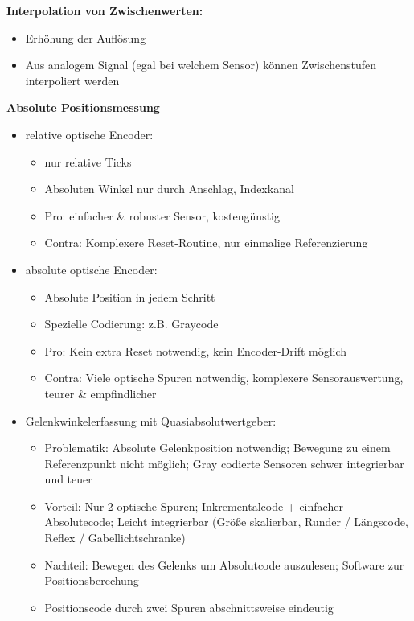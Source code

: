 \textbf{Interpolation von Zwischenwerten:}
\begin{itemize}
\setlength\itemsep{0em}
\item Erhöhung der Auflösung
\item Aus analogem Signal (egal bei welchem Sensor) können Zwischenstufen interpoliert werden
\end{itemize}

\textbf{Absolute Positionsmessung}
\begin{itemize}
\setlength\itemsep{0em}
\item relative optische Encoder:
\begin{itemize}
\setlength\itemsep{0em}
\item nur relative Ticks
\item Absoluten Winkel nur durch Anschlag, Indexkanal
\item Pro: einfacher \& robuster Sensor, kostengünstig
\item Contra: Komplexere Reset-Routine, nur einmalige Referenzierung
\end{itemize}
\item absolute optische Encoder: 
\begin{itemize}
\setlength\itemsep{0em}
\item Absolute Position in jedem Schritt
\item Spezielle Codierung: z.B. Graycode
\item Pro: Kein extra Reset notwendig, kein Encoder-Drift möglich
\item Contra: Viele optische Spuren notwendig, komplexere Sensorauswertung, teurer \& empfindlicher
\end{itemize}
\item Gelenkwinkelerfassung mit Quasiabsolutwertgeber:
\begin{itemize}
\setlength\itemsep{0em}
\item Problematik: Absolute Gelenkposition notwendig; Bewegung zu einem Referenzpunkt nicht möglich; Gray codierte Sensoren schwer integrierbar und teuer
\item Vorteil: Nur 2 optische Spuren; Inkrementalcode + einfacher Absolutecode; Leicht integrierbar (Größe skalierbar, Runder / Längscode, Reflex / Gabellichtschranke)
\item Nachteil: Bewegen des Gelenks um Absolutcode auszulesen; Software zur Positionsberechung
\item Positionscode durch zwei Spuren abschnittsweise eindeutig
\end{itemize}
\end{itemize}
